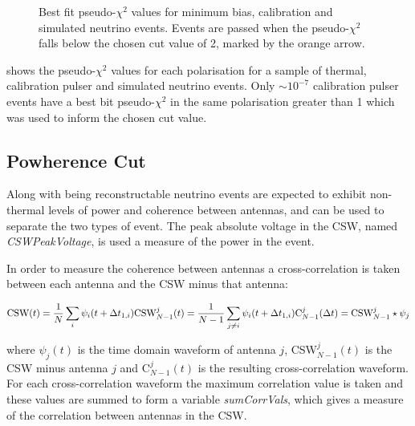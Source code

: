 \begin{figure}[htpb]
  \hfill
  \caption{Best fit pseudo-$\chi^{2}$ values for minimum bias, calibration and simulated neutrino events. Events are passed when the pseudo-$\chi^{2}$ falls below the chosen cut value of 2, marked by the orange arrow.}
  \label{fig:Analysis:Thermal-Cuts:Pseudo-ChiSq}
\end{figure}
  
 shows the pseudo-$\chi^{2}$ values for each polarisation for a sample of thermal, calibration pulser and simulated neutrino events. Only $\sim 10^{-7}$ calibration pulser events have a best bit pseudo-$\chi^{2}$ in the same polarisation greater than 1 which was used to inform the chosen cut value.

\subsection{Powherence Cut}
\label{sec:Analysis:Thermal-Cuts:Powherence}

Along with being reconstructable neutrino events are expected to exhibit non-thermal levels of power and coherence between antennas, and can be used to separate the two types of event. The peak absolute voltage in the CSW, named \textit{CSWPeakVoltage}, is used a measure of the power in the event. 

In order to measure the coherence between antennas a cross-correlation is taken between each antenna and the CSW minus that antenna:

\begin{equation}
  \mbox{CSW}(t) = \frac{1}{N}\sum_{i} \psi_{i}(t+\Delta t_{1,i})\\
  \mbox{CSW}_{N-1}^{j}(t) = \frac{1}{N-1}\sum_{j \neq i} \psi_{i}(t+\Delta t_{1,i})\\
  \mbox{C}_{N-1}^{j}(\Delta t) = {\mbox{CSW}_{N-1}^{j} \star \psi_{j}}
\end{equation}

\noindent where $\psi_{j}(t)$ is the time domain waveform of antenna $j$, CSW$_{N-1}^{j}(t)$ is the CSW minus antenna $j$ and C$_{N-1}^{j}(t)$ is the resulting cross-correlation waveform. For each cross-correlation waveform the maximum correlation value is taken and these values are summed to form a variable \textit{sumCorrVals}, which gives a measure of the correlation between antennas in the CSW.

